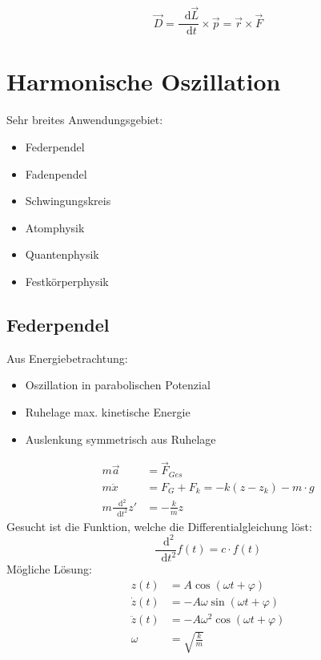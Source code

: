 \documentclass[a4paper,12pt]{report}
\newcommand*\diff{\mathop{}\!\mathrm{d}}
\begin{document}
\begin{equation}
\vec{D} = \frac{\diff \vec{L}}{\diff t} \times \vec{p} = \vec{r} \times \vec{F}
\end{equation}     


\section{Harmonische Oszillation}

Sehr breites Anwendungsgebiet:

\begin{itemize} 
\item Federpendel
\item Fadenpendel 
\item Schwingungskreis
\item Atomphysik
\item Quantenphysik
\item Festkörperphysik
\end{itemize}

\subsection{Federpendel}

Aus Energiebetrachtung: 
\begin{itemize}
\item Oszillation in parabolischen Potenzial
\item Ruhelage max. kinetische Energie
\item Auslenkung symmetrisch aus Ruhelage
\end{itemize}

\begin{align*}
m \vec{a} &= \vec{F}_{Ges} \\
m \ddot{x} &= F_G + F_k = -k(z-z_k) - m \cdot g \\
m \frac{\diff^2}{\diff t^2} z' &= - \frac{k}{m} z 
\end{align*}
Gesucht ist die Funktion, welche die Differentialgleichung löst:
\begin{equation}
\frac{\diff^2}{\diff t^2} f(t) = c \cdot f(t) 
\end{equation}
Mögliche Lösung:
\begin{align*}
z(t) &= A \cos(\omega t + \varphi)  \\
\dot{z}(t) &= -A \omega \sin(\omega t + \varphi) \\
\ddot{z}(t) &= -A \omega^2 \cos(\omega t + \varphi) \\
\omega &= \sqrt{\frac{k}{m}}
\end{align*}
\end{document}

